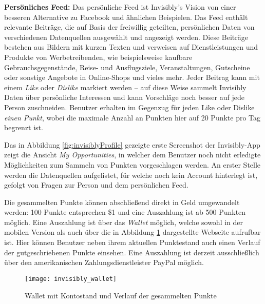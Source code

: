 \noindent \textbf{Persönliches Feed:} Das persönliche Feed ist Invisibly's Vision von einer besseren Alternative zu Facebook und ähnlichen Beispielen. Das Feed enthält relevante Beiträge, die auf Basis der freiwillig geteilten, persönlichen Daten von verschiedenen Datenquellen ausgewählt und angezeigt werden. Diese Beiträge bestehen aus Bildern mit kurzen Texten und verweisen auf Dienstleistungen und Produkte von Werbetreibenden, wie beispielsweise kaufbare Gebrauchsgegenstände, Reise- und Ausflugsziele, Veranstaltungen, Gutscheine oder sonstige Angebote in Online-Shops und vieles mehr. Jeder Beitrag kann mit einem \textit{Like} oder \textit{Dislike} markiert werden -- auf diese Weise sammelt Invisibly Daten über persönliche Interessen und kann Vorschläge noch besser auf jede Person zuschneiden. Benutzer erhalten im Gegenzug für jeden Like oder Dislike \textit{einen Punkt}, wobei die maximale Anzahl an Punkten hier auf 20 Punkte pro Tag begrenzt ist. \cite{invisiblyWhyPay_2021} \newline

\noindent Das in Abbildung \ref{fig:invisiblyProfile} gezeigte erste Screenshot der Invisibly-App zeigt die Ansicht \textit{My Opportunities}, in welcher dem Benutzer noch nicht erledigte Möglichkeiten zum Sammeln von Punkten vorgeschlagen werden. An erster Stelle werden die Datenquellen aufgelistet, für welche noch kein Account hinterlegt ist, gefolgt von Fragen zur Person und dem persönlichen Feed. \newline

\noindent Die gesammelten Punkte können abschließend direkt in Geld umgewandelt werden: 100 Punkte entsprechen \$1 und eine Auszahlung ist ab 500 Punkten möglich. \cite{invisiblyWhyPay_2021} Eine Auszahlung ist über das \textit{Wallet} möglich, welche sowohl in der mobilen Version als auch über die in Abbildung \ref{fig:invisiblyWallet} dargestellte Webseite aufrufbar ist. Hier können Benutzer neben ihrem aktuellen Punktestand auch einen Verlauf der gutgeschriebenen Punkte einsehen. Eine Auszahlung ist derzeit ausschließlich über den amerikanischen Zahlungsdienstleister PayPal möglich. \newline

\begin{figure}[!ht]
	\centering
	\texttt{[image: invisibly\_wallet]}
	\caption{Wallet mit Kontostand und Verlauf der gesammelten Punkte \cite{behanceInvisibly_2021}}
	\label{fig:invisiblyWallet}
\end{figure}
\FloatBarrier

